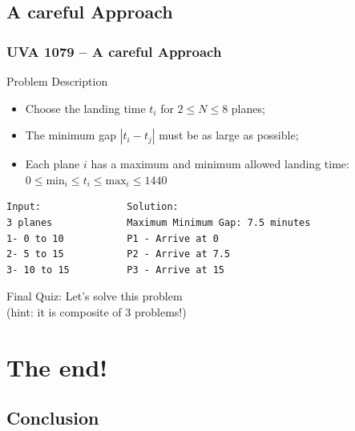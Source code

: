 \documentclass{beamer}
\begin{document}
\subsection{A careful Approach}
\begin{frame}[fragile]
  \frametitle{UVA 1079 -- A careful Approach}

  {\smaller
    \begin{block}{Problem Description}
      \begin{itemize}
      \item Choose the landing time $t_i$ for $2 \leq N \leq 8$ planes;
      \item The minimum gap $|t_i - t_j|$ must be as large as possible;
      \item Each plane $i$ has a maximum and minimum allowed landing time:\\
        $0 \leq \text{min}_i \leq t_i \leq \text{max}_i \leq 1440$
      \end{itemize}
    \end{block}

\begin{verbatim}
Input:               Solution:
3 planes             Maximum Minimum Gap: 7.5 minutes
1- 0 to 10           P1 - Arrive at 0
2- 5 to 15           P2 - Arrive at 7.5
3- 10 to 15          P3 - Arrive at 15
\end{verbatim}
  }

  \alert{Final Quiz:} Let's solve this problem\\
  (hint: it is composite of 3 problems!)
\end{frame}

\section{The end!}
\subsection{Conclusion}


\end{document}
